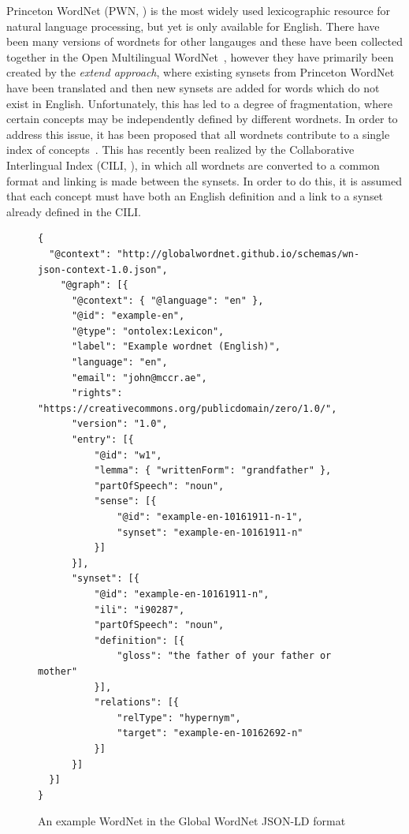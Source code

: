 \documentclass[12pt,a4paper]{elex2017}
\begin{document}
Princeton WordNet (PWN, \cite{fellbaum2010wordnet}) is the most widely used
lexicographic resource for natural language processing, but yet is only
available for English. There have been many versions of wordnets for other
langauges and these have been collected together in the Open Multilingual
WordNet~\citep{bond2013linking}, however they have primarily been created by the
\emph{extend approach}, where existing synsets from Princeton WordNet have been
translated and then new synsets are added for words which do not exist in
English. Unfortunately, this has led to a degree of fragmentation, where certain
concepts may be independently defined by different wordnets. In order to address
this issue, it has been proposed that all wordnets contribute to a single index
of concepts~\citep{pease2008building}. This has recently been realized by the
Collaborative Interlingual Index (CILI, \cite{bond2016cili}), in which all
wordnets are converted to a common format and linking is made between the
synsets. In order to do this, it is assumed that each concept must have both an
English definition and a link to a synset already defined in the CILI. 

\begin{figure}
    \footnotesize
    \begin{verbatim}
{ 
  "@context": "http://globalwordnet.github.io/schemas/wn-json-context-1.0.json",
    "@graph": [{
      "@context": { "@language": "en" },
      "@id": "example-en",
      "@type": "ontolex:Lexicon", 
      "label": "Example wordnet (English)",
      "language": "en",
      "email": "john@mccr.ae",
      "rights": "https://creativecommons.org/publicdomain/zero/1.0/",
      "version": "1.0",
      "entry": [{
          "@id": "w1",
          "lemma": { "writtenForm": "grandfather" },
          "partOfSpeech": "noun",
          "sense": [{
              "@id": "example-en-10161911-n-1",
              "synset": "example-en-10161911-n"
          }]
      }],
      "synset": [{
          "@id": "example-en-10161911-n",
          "ili": "i90287",
          "partOfSpeech": "noun",
          "definition": [{
              "gloss": "the father of your father or mother"
          }],
          "relations": [{
              "relType": "hypernym",
              "target": "example-en-10162692-n"
          }]
      }]
  }]
}
    \end{verbatim}
    \caption{\label{fig:json-example}An example WordNet in the Global WordNet
    JSON-LD format}
\end{figure}
\end{document}
